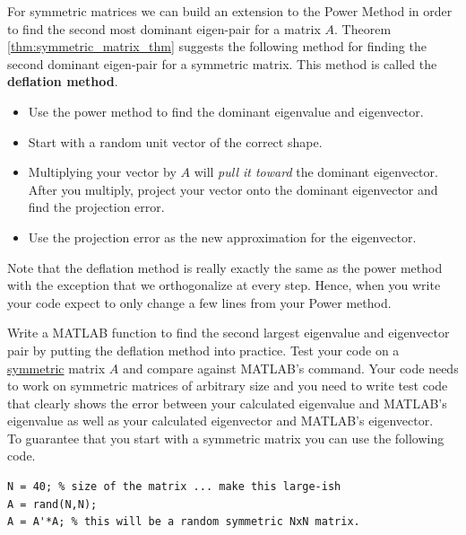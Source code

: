 \begin{problem}
    For symmetric matrices we can build an extension to the Power Method in order
    to find the second most dominant eigen-pair for a matrix $A$.  Theorem
    \ref{thm:symmetric_matrix_thm} suggests the following method for finding the second
    dominant eigen-pair for a symmetric matrix.  This method is called the {\bf deflation
    method}.
    \begin{itemize}
        \item Use the power method to find the dominant eigenvalue and eigenvector.
        \item Start with a random unit vector of the correct shape.
        \item Multiplying your vector by $A$ will {\it pull it toward} the dominant
            eigenvector.  After you multiply, project your vector onto the dominant
            eigenvector and find the projection error.  
        \item Use the projection error as the new approximation for the eigenvector.
    \end{itemize}    

    Note that the deflation method is really exactly the same as the power method with the
    exception that we orthogonalize at every step.  Hence, when you write your code expect
    to only change a few lines from your Power method.

    Write a
    MATLAB function  to find the second largest eigenvalue and
    eigenvector pair by putting the deflation method into practice. Test your code on a
    \underline{symmetric} matrix $A$ and compare against MATLAB's  command.
    Your code needs to work on symmetric matrices of arbitrary size and you need to write
    test code that clearly shows the error between your calculated eigenvalue and MATLAB's
    eigenvalue as well as your calculated eigenvector and MATLAB's eigenvector.\\ To
    guarantee that you start with a symmetric matrix you can use the following code.
\begin{lstlisting}
N = 40; % size of the matrix ... make this large-ish
A = rand(N,N);
A = A'*A; % this will be a random symmetric NxN matrix.
\end{lstlisting}
\end{problem}



